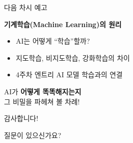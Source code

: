 \documentclass[aspectratio=169]{beamer}
\begin{document}
\begin{frame}{다음 차시 예고}
\begin{center}
\Large \textbf{기계학습(Machine Learning)의 원리}
\end{center}
\vspace{0.5cm}
\begin{itemize}
    \item AI는 어떻게 ``학습''할까?
    \item 지도학습, 비지도학습, 강화학습의 차이
    \item 4주차 엔트리 AI 모델 학습과의 연결
\end{itemize}
\vspace{0.5cm}
\begin{center}
AI가 \textbf{어떻게 똑똑해지는지}\\그 비밀을 파헤쳐 볼 차례! 
\end{center}
\end{frame}

\begin{frame}[standout]
 감사합니다!

\vspace{0.5cm}
질문이 있으신가요?
\end{frame}
\end{document}
